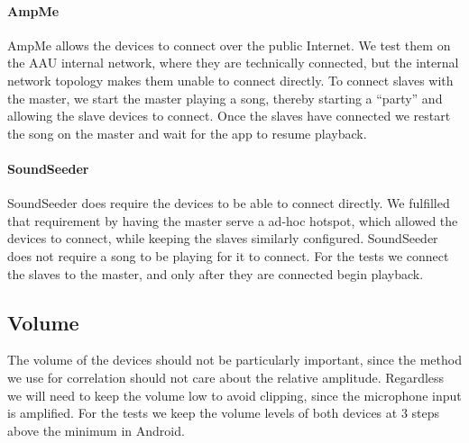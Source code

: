 \paragraph{AmpMe}
AmpMe allows the devices to connect over the public Internet. We test
them on the AAU internal network, where they are technically connected,
but the internal network topology makes them unable to connect directly.
To connect slaves with the master, we start the master playing a song,
thereby starting a ``party'' and allowing the slave devices to
connect. Once the slaves have connected we restart the song on the
master and wait for the app to resume playback.

\paragraph{SoundSeeder}
SoundSeeder does require the devices to be able to connect directly. We
fulfilled that requirement by having the master serve a ad-hoc hotspot,
which allowed the devices to connect, while keeping the slaves
similarly configured. SoundSeeder does not require a song to be playing
for it to connect. For the tests we connect the slaves to the master,
and only after they are connected begin playback.

\subsection{Volume}
The volume of the devices should not be particularly important, since
the method we use for correlation should not care about the relative
amplitude. Regardless we will need to keep the volume low to avoid
clipping, since the microphone input is amplified. For the tests we keep
the volume levels of both devices at 3 steps above the minimum in
Android.

